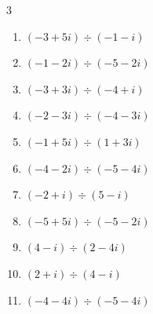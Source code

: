 \begin{multicols}{3}
\begin{enumerate}

\columnbreak %

  \item $\displaystyle (-3+5i)\div(-1-i)$

        \phantom{$\displaystyle =-1-4i$}

  \item $\displaystyle (-1-2i)\div(-5-2i)$


  \item $\displaystyle (-3+3i)\div(-4+i)$


  \item $\displaystyle (-2-3i)\div(-4-3i)$


  \item $\displaystyle (-1+5i)\div(1+3i)$


  \item $\displaystyle (-4-2i)\div(-5-4i)$


  \item $\displaystyle (-2+i)\div(5-i)$


  \item $\displaystyle (-5+5i)\div(-5-2i)$


  \item $\displaystyle (4-i)\div(2-4i)$


  \item $\displaystyle (2+i)\div(4-i)$


\columnbreak %

\resetques

  \item $\displaystyle (-4-4i)\div(-5-4i)$


\end{enumerate}
\end{multicols}

